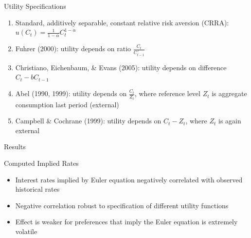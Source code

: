 \documentclass{beamer}
\begin{document}
\begin{frame}{Utility Specifications}
\begin{enumerate}
\item Standard, additively separable, constant relative risk aversion (CRRA): $u(C_t) = \frac{1}{1-\alpha} C_t^{1-\alpha}$
\item Fuhrer (2000): utility depends on ratio $\frac{C_t}{C_{t-1}^\gamma}$
\item  Christiano, Eichenbaum, \& Evans (2005): utility depends on difference $C_t - b C_{t-1}$
\item Abel (1990, 1999): utility depends on $\frac{C_t}{Z_t}$, where reference level $Z_t$ is aggregate consumption last period (external)
\item Campbell \& Cochrane (1999): utility depends on $C_t - Z_t$, where $Z_t$ is again external
\end{enumerate}
\end{frame}


\begin{frame}{Results}
\begin{center}
Computed Implied Rates
\end{center}
\bigskip
\begin{itemize}
\item Interest rates implied by Euler equation negatively correlated with observed historical rates
\item Negative correlation robust to specification of different utility functions
\item Effect is weaker for preferences that imply the Euler equation is extremely volatile
\end{itemize}
\end{frame}
\end{document}
